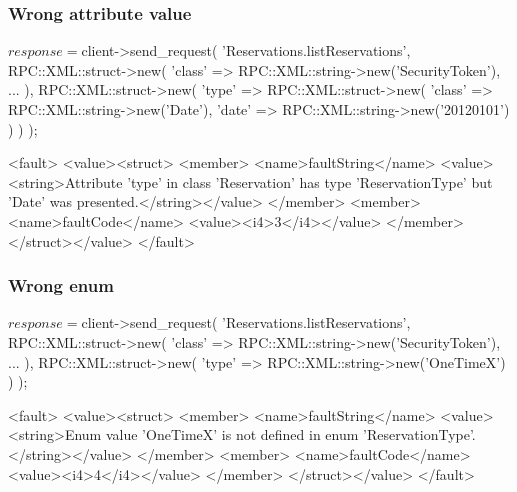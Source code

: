 \documentclass[a4paper]{report}
\begin{document}
\subsubsection{Wrong attribute value}
\begin{PerlCmd}
$response = $client->send_request(
    'Reservations.listReservations',
    RPC::XML::struct->new(
        'class' => RPC::XML::string->new('SecurityToken'),
        ...
    ),
    RPC::XML::struct->new(
        'type' => RPC::XML::struct->new(
            'class' => RPC::XML::string->new('Date'),
            'date' => RPC::XML::string->new('20120101')
        )
    )
);
\end{PerlCmd}
\begin{PerlResponse}
<fault>
  <value><struct>
    <member>
      <name>faultString</name>
      <value><string>Attribute 'type' in class 'Reservation' has type
          'ReservationType' but 'Date' was presented.</string></value>
    </member>
    <member>
      <name>faultCode</name>
      <value><i4>3</i4></value>
    </member>
  </struct></value>
</fault>
\end{PerlResponse}

\subsubsection{Wrong enum}
\begin{PerlCmd}
$response = $client->send_request(
    'Reservations.listReservations',
    RPC::XML::struct->new(
        'class' => RPC::XML::string->new('SecurityToken'),
        ...
    ),
    RPC::XML::struct->new(
        'type' => RPC::XML::string->new('OneTimeX')
    )
);
\end{PerlCmd}
\begin{PerlResponse}
<fault>
  <value><struct>
    <member>
      <name>faultString</name>
      <value><string>Enum value 'OneTimeX' is not defined in enum
          'ReservationType'.</string></value>
    </member>
    <member>
      <name>faultCode</name>
      <value><i4>4</i4></value>
    </member>
  </struct></value>
</fault>
\end{PerlResponse}
\end{document}
